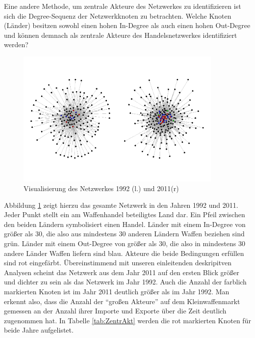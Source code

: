 \documentclass[a4paper,ngerman,oneside,titlepage,bibliography=totoc,11pt]{scrreprt}
\begin{document}
Eine andere Methode, um zentrale Akteure des Netzwerkes zu identifizieren ist sich die Degree-Sequenz der Netzwerkknoten zu betrachten. Welche Knoten (Länder) besitzen sowohl einen hohen In-Degree als auch einen hohen Out-Degree und können demnach als zentrale Akteure des Handelsnetzwerkes identifiziert werden?
\begin{figure}[h]
	\centering
		\includegraphics[width=0.90\textwidth]{Grafiken/ts_network.png}
	\caption{Visualisierung des Netzwerkes 1992 (l.) und 2011(r)}
	\label{fig:ts_network}
\end{figure}

Abbildung \ref{fig:ts_network} zeigt hierzu das gesamte Netzwerk in den Jahren 1992 und 2011. Jeder Punkt stellt ein am Waffenhandel beteiligtes Land dar. Ein Pfeil zwischen den beiden Ländern symbolisiert einen Handel. Länder mit einem In-Degree von größer als 30, die also aus mindestens 30 anderen Ländern Waffen beziehen sind grün. Länder mit einem Out-Degree von größer als 30, die also in mindestens 30 andere Länder Waffen liefern sind blau. Akteure die beide Bedingungen erfüllen sind rot eingefärbt. Übereinstimmend mit unseren einleitenden deskripitven Analysen scheint das Netzwerk aus dem Jahr 2011 auf den ersten Blick größer und dichter zu sein als das Netzwerk im Jahr 1992. Auch die Anzahl der farblich markierten Knoten ist im Jahr 2011 deutlich größer als im Jahr 1992. Man erkennt also, dass die Anzahl der "`großen Akteure"' auf dem Kleinwaffenmarkt gemessen an der Anzahl ihrer Importe und Exporte über die Zeit deutlich zugenommen hat. In Tabelle \ref{tab:ZentrAkt} werden die rot markierten Knoten für beide Jahre aufgelistet. 
\end{document}
